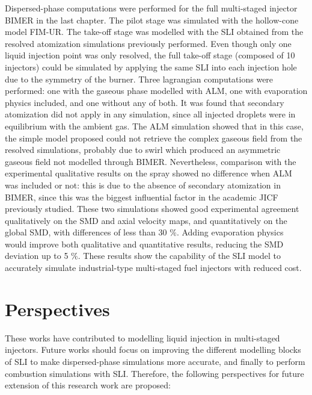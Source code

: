 Dispersed-phase computations were performed for the full multi-staged injector BIMER in the last chapter. The pilot stage was simulated with the hollow-cone model FIM-UR. The take-off stage was modelled with the SLI obtained from the resolved atomization simulations previously performed. Even though only one liquid injection point was only resolved, the full take-off stage (composed of 10 injectors) could be simulated by applying the same SLI into each injection hole due to the symmetry of the burner. Three lagrangian computations were performed: one with the gaseous phase modelled with ALM, one with evaporation physics included, and one without any of both. It was found that secondary atomization did not apply in any simulation, since all injected droplets were in equilibrium with the ambient gas. The ALM simulation showed that in this case, the simple model proposed could not retrieve the complex gaseous field from the resolved simulations, probably due to swirl which produced an asymmetric gaseous field not modelled through BIMER. Nevertheless, comparison with the experimental qualitative results on the spray showed no difference when ALM was included or not: this is due to the absence of secondary atomization in BIMER, since this was the biggest influential factor in the academic JICF previously studied. These two simulations showed good experimental agreement qualitatively on the SMD and axial velocity maps, and quantitatively on the global SMD, with differences of less than 30 $\%$. Adding evaporation physics would improve both qualitative and quantitative results, reducing the SMD deviation up to 5 $\%$. These results show the capability of the SLI model to accurately simulate industrial-type multi-staged fuel injectors with reduced cost.




\section*{Perspectives}

These works have contributed to modelling liquid injection in multi-staged injectors. Future works should focus on improving the different modelling blocks of SLI to make dispersed-phase simulations more accurate, and finally to perform combustion simulations with SLI. Therefore, the following perspectives for future extension of this research work are proposed:


